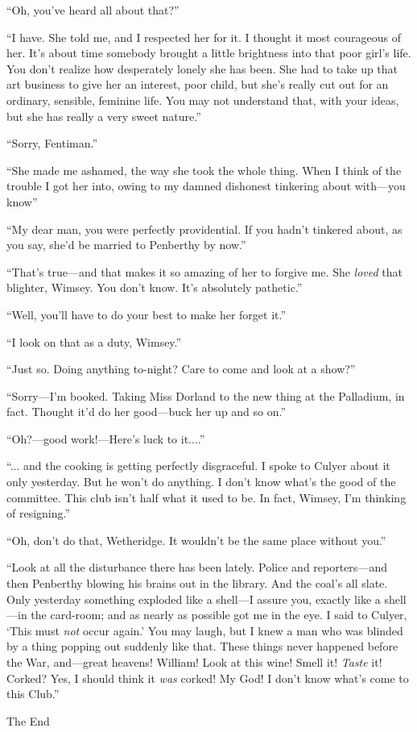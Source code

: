 \enquote{Oh, you've heard all about that?}

\enquote{I have. She told me, and I respected her for it. I thought it most courageous of her. It's about time somebody brought a little brightness into that poor girl's life. You don't realize how desperately lonely she has been. She had to take up that art business to give her an interest, poor child, but she's really cut out for an ordinary, sensible, feminine life. You may not understand that, with your ideas, but she has really a very sweet nature.}

\enquote{Sorry, Fentiman.}

\enquote{She made me ashamed, the way she took the whole thing. When I think of the trouble I got her into, owing to my damned dishonest tinkering about with\allowbreak---\allowbreak you know\longdash}

\enquote{My dear man, you were perfectly providential. If you hadn't tinkered about, as you say, she'd be married to Penberthy by now.}

\enquote{That's true\allowbreak---\allowbreak and that makes it so amazing of her to forgive me. She \textit{loved} that blighter, Wimsey. You don't know. It's absolutely pathetic.}

\enquote{Well, you'll have to do your best to make her forget it.}

\enquote{I look on that as a duty, Wimsey.}

\enquote{Just so. Doing anything to-night? Care to come and look at a show?}

\enquote{Sorry\allowbreak---\allowbreak I'm booked. Taking Miss Dorland to the new thing at the Palladium, in fact. Thought it'd do her good\allowbreak---\allowbreak buck her up and so on.}

\enquote{Oh?---good work!---Here's luck to it....}

\enquote{... and the cooking is getting perfectly disgraceful. I spoke to Culyer about it only yesterday. But he won't do anything. I don't know what's the good of the committee. This club isn't half what it used to be. In fact, Wimsey, I'm thinking of resigning.}

\enquote{Oh, don't do that, Wetheridge. It wouldn't be the same place without you.}

\enquote{Look at all the disturbance there has been lately. Police and reporters\allowbreak---\allowbreak and then Penberthy blowing his brains out in the library. And the coal's all slate. Only yesterday something exploded like a shell\allowbreak---\allowbreak I assure you, exactly like a shell\allowbreak---\allowbreak in the card-room; and as nearly as possible got me in the eye. I said to Culyer, \enquote{This must \textit{not} occur again.} You may laugh, but I knew a man who was blinded by a thing popping out suddenly like that. These things never happened before the War, and\allowbreak---\allowbreak great heavens! William! Look at this wine! Smell it! \textit{Taste} it! Corked? Yes, I should think it \textit{was} corked! My God! I don't know what's come to this Club.}
\vfill
\begin{center}
{\mytitlefont\moderatelyhuge The End}
\end{center}